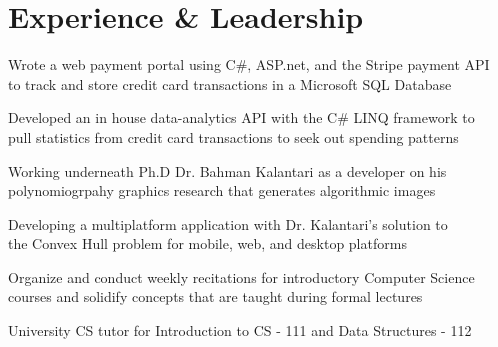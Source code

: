 \documentclass[]{deedy-resume-openfont}
\begin{document}
\begin{minipage}[t]{0.66\textwidth} 


\section{Experience \& Leadership}

\vspace{\topsep} 
\begin{tightemize}
\item Wrote a web payment portal using C\#, ASP.net, and the Stripe payment API \\to track and store credit card transactions in a Microsoft SQL Database
\item Developed an in house data-analytics API with the C\# LINQ framework to \\pull statistics from credit card transactions to seek out spending patterns
\end{tightemize}
\sectionsep

\begin{tightemize}
\item Working underneath Ph.D Dr. Bahman Kalantari as a developer on his polynomiogrpahy graphics research that generates algorithmic images  
\item Developing a multiplatform application with Dr. Kalantari's solution to \\the Convex Hull problem for mobile, web, and desktop platforms
\end{tightemize}
\sectionsep

\begin{tightemize}
\item Organize and conduct weekly recitations for introductory Computer Science courses and solidify concepts that are taught during formal lectures
\item University CS tutor for Introduction to CS - 111 and Data Structures - 112
\end{tightemize}
\sectionsep


\end{minipage}
\end{document}
